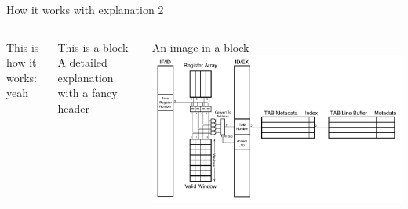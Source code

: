 \documentclass{beamer}
\begin{document}
\begin{frame}{How it works with explanation 2}
   \begin{columns} %
         This is how it works: yeah
      \begin{block}{This is a block}
         A detailed explanation with a fancy header
      \end{block}
      \begin{block}{An image in a block}
         \includegraphics[width=\textwidth]{figures/tabhardware.pdf}
      \end{block}
   \end{columns}
\end{frame}
\end{document}
